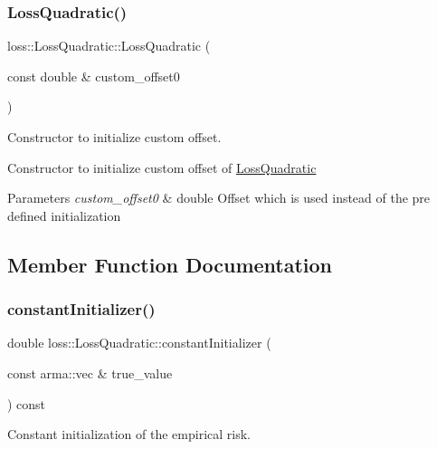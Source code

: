\subsubsection{\texorpdfstring{Loss\+Quadratic()}{LossQuadratic()}\hspace{0.1cm}{\footnotesize\ttfamily [2/2]}}
{\footnotesize\ttfamily loss\+::\+Loss\+Quadratic\+::\+Loss\+Quadratic (\begin{DoxyParamCaption}\item[{const double \&}]{custom\+\_\+offset0 }\end{DoxyParamCaption})}



Constructor to initialize custom offset. 

Constructor to initialize custom offset of {\ttfamily \mbox{\hyperlink{classloss_1_1_loss_quadratic}{Loss\+Quadratic}}}


\begin{DoxyParams}{Parameters}
{\em custom\+\_\+offset0} & {\ttfamily double} Offset which is used instead of the pre defined initialization \\
\hline
\end{DoxyParams}


\subsection{Member Function Documentation}
\mbox{\label{classloss_1_1_loss_quadratic_a8519141a797078485d04038ad44a4592}} 
\subsubsection{\texorpdfstring{constant\+Initializer()}{constantInitializer()}}
{\footnotesize\ttfamily double loss\+::\+Loss\+Quadratic\+::constant\+Initializer (\begin{DoxyParamCaption}\item[{const arma\+::vec \&}]{true\+\_\+value }\end{DoxyParamCaption}) const\hspace{0.3cm}{\ttfamily [virtual]}}



Constant initialization of the empirical risk. 

